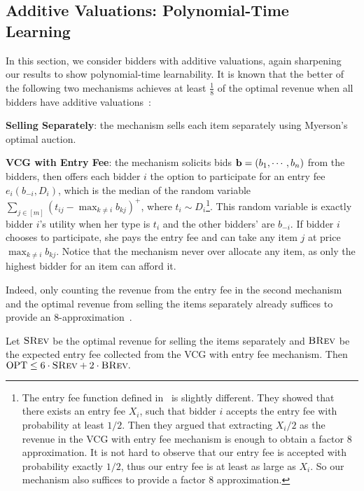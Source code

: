 \subsection{Additive Valuations: Polynomial-Time Learning}\label{sec:additive}
In this section, we consider bidders with additive valuations, again sharpening our results to show polynomial-time learnability. It is known that the better of the following two mechanisms achieves at least $\frac{1}{8}$ of the optimal revenue when all bidders have additive valuations~\cite{Yao15,CaiDW16}:

\vspace{.05in}	
\noindent\textbf{Selling Separately}: the mechanism sells each item separately using Myerson's optimal auction.

\vspace{.05in}	
\noindent \textbf{VCG with Entry Fee}: the mechanism solicits bids $\bold{b}=(b_1,\cdots, b_n)$ from the bidders, then offers each bidder $i$ the option to participate for an entry fee $e_i(b_{-i},D_i)$, which is the median of the random variable $\sum_{j\in[m]}(t_{ij}-\max_{k\neq i} b_{kj})^+$, where $t_i\sim D_i$\footnote{The entry fee function defined in~\cite{Yao15,CaiDW16} is slightly different. They showed that there exists an entry fee $X_i$, such that bidder $i$ accepts the entry fee with probability at least $1/2$. Then they argued that extracting $X_i/2$ as the revenue in the VCG with entry fee mechanism is enough to obtain a factor $8$ approximation. It is not hard to observe that our entry fee is accepted with probability exactly $1/2$, thus our entry fee is at least as large as $X_i$. So our mechanism also suffices to provide a factor $8$ approximation.}. This random variable is exactly bidder $i$'s utility when her type is $t_i$ and the other bidders' are $b_{-i}$. If bidder $i$ chooses to participate, she pays the entry fee and can take any item $j$ at price $\max_{k\neq i} b_{kj}$. Notice that the mechanism never over allocate any item, as only the highest bidder for an item can afford it. %

Indeed, only counting the revenue from the entry fee in the second mechanism and the optimal revenue from selling the items separately already suffices to provide an $8$-approximation~\cite{Yao15, CaiDW16}. 

\begin{theorem}\label{thm:UB additive}
	Let $\textsc{SRev}$ be the optimal revenue for selling the items separately and $\textsc{BRev}$ be the expected entry fee collected from the VCG with entry fee mechanism. Then $\text{OPT}\leq 6\cdot \textsc{SRev}+2\cdot\textsc{BRev}.$ 
\end{theorem}

